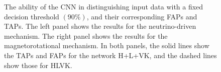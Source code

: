 \documentclass[aps,twocolumn,showpacs,groupedaddress, nofootinbib]{revtex4}  %
\begin{document}
%
%
\begin{figure}
     \begin{center}
        \quad
    \end{center}
    \caption{The ability of the \ac{CNN} in
distinguishing input data with a fixed decision threshold $(90\%)$, 
and their corresponding \acp{FAP} and \acp{TAP}. 
The left panel shows the results for the neutrino-driven mechanism.
The right panel shows the results for the magnetorotational mechanism. 
In both panels, the solid lines show the \acp{TAP} and \acp{FAP} 
for the network H+L+VK, and the
dashed lines show those for HLVK.\label{fig:ROCfixed}}
\end{figure}
\end{document}
